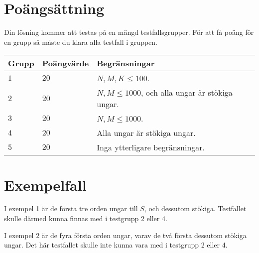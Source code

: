 \section*{Poängsättning}
Din lösning kommer att testas på en mängd testfallsgrupper.
För att få poäng för en grupp så måste du klara alla testfall i gruppen.

\noindent
\begin{tabular}{| l | l | l |}
  \hline
  Grupp & Poängvärde & Begränsningar \\ \hline
  $1$   & $20$       & $N, M, K \le 100$. \\ \hline
  $2$   & $20$       & $N, M \le 1000$, och alla ungar är stökiga ungar. \\ \hline
  $3$   & $20$       & $N, M \le 1000$. \\ \hline
  $4$   & $20$       & Alla ungar är stökiga ungar. \\ \hline
  $5$   & $20$       & Inga ytterligare begränsningar. \\ \hline
\end{tabular}

\section*{Exempelfall}
I exempel 1 är de första tre orden ungar till $S$, och dessutom stökiga. Testfallet skulle därmed kunna finnas med i testgrupp 2 eller 4.

I exempel 2 är de fyra första orden ungar, varav de två första dessutom stökiga ungar. Det här testfallet skulle inte kunna vara med i testgrupp 2 eller 4.
